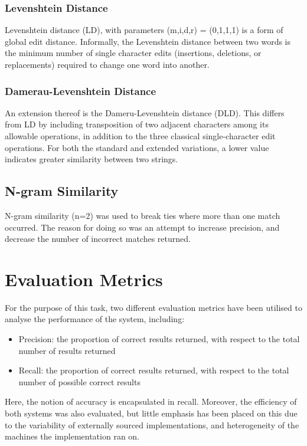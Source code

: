 \documentclass[11pt]{article}
\begin{document}
\subsubsection{Levenshtein Distance}
Levenshtein distance \cite{Yianilos} \cite{Kondrak} (LD), with parameters (m,i,d,r) = (0,1,1,1) is a form of global edit distance. Informally, the Levenshtein distance between two words is the minimum number of single character edits (insertions, deletions, or replacements) required to change one word into another. 

\subsubsection{Damerau-Levenshtein Distance}
An extension thereof is the Dameru-Levenshtein distance \cite{Marteu} (DLD). This differs from LD by including transposition of two adjacent characters among its allowable operations, in addition to the three classical  single-character edit operations. For both the standard and extended variations, a lower value indicates greater similarity between two strings.

\subsection{N-gram Similarity}
N-gram similarity (n=2) was used to break ties where more than one match occurred. The reason for doing so was an attempt to increase precision, and decrease the number of incorrect matches returned.


\section{Evaluation Metrics}
For the purpose of this task, two different evaluation metrics have been utilised to analyse the performance of the system, including:
\begin{itemize}
\item Precision: the proportion of correct results returned, with respect to the total number of results returned
\item Recall: the proportion of correct results returned, with respect to the total number of possible correct results
\end{itemize}
Here, the notion of accuracy is encapsulated in recall.
Moreover, the efficiency of both systems was also evaluated, but little emphasis has been placed on this
due to the variability of externally sourced implementations, and heterogeneity of the machines the implementation ran on.
\end{document}
